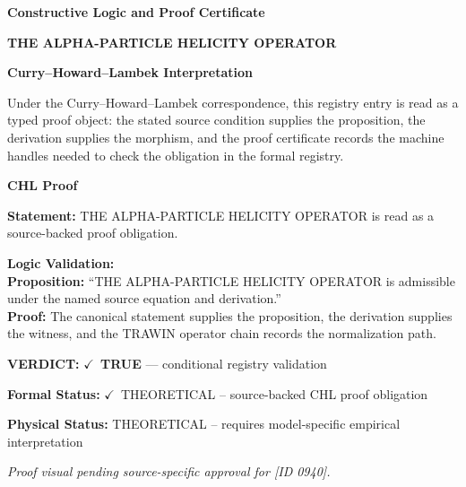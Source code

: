 \clearpage
\begingroup\tzpsupportsetup
\noindent\textbf{\fontsize{10.8pt}{12.8pt}\selectfont [ID 0940] Constructive Logic and Proof Certificate}\par
\noindent\textbf{\fontsize{10pt}{12pt}\selectfont THE ALPHA-PARTICLE HELICITY OPERATOR}\par
\vspace{0.45em}
\begingroup
\footnotesize
\setlength{\parskip}{0.22em}
\setlength{\parindent}{0pt}
\noindent\textbf{Curry--Howard--Lambek Interpretation}\par
Under the Curry--Howard--Lambek correspondence, this registry entry is read as a typed proof
object: the stated source condition supplies the proposition, the derivation supplies the
morphism, and the proof certificate records the machine handles needed to check the obligation
in the formal registry.

\vspace{0.45em}
\noindent\textbf{CHL Proof}\par
\textbf{Statement:} THE ALPHA-PARTICLE HELICITY OPERATOR is read as a source-backed proof obligation.

\textbf{Logic Validation:}\\
\textbf{Proposition:} ``THE ALPHA-PARTICLE HELICITY OPERATOR is admissible under the named source equation and derivation.''\\
\textbf{Proof:} The canonical statement supplies the proposition, the derivation supplies the witness, and the TRAWIN operator chain records the normalization path.

\textbf{VERDICT:} \ensuremath{\checkmark}\ \textbf{TRUE} --- conditional registry validation

\textbf{Formal Status:} \ensuremath{\checkmark}\ THEORETICAL -- source-backed CHL proof obligation

\textbf{Physical Status:} THEORETICAL -- requires model-specific empirical interpretation
\par\vspace{0.45em}
\par
\vfill
\begingroup\footnotesize\itshape
Proof visual pending source-specific approval for [ID 0940].
\par\endgroup
\vfill
\endgroup
\endgroup
